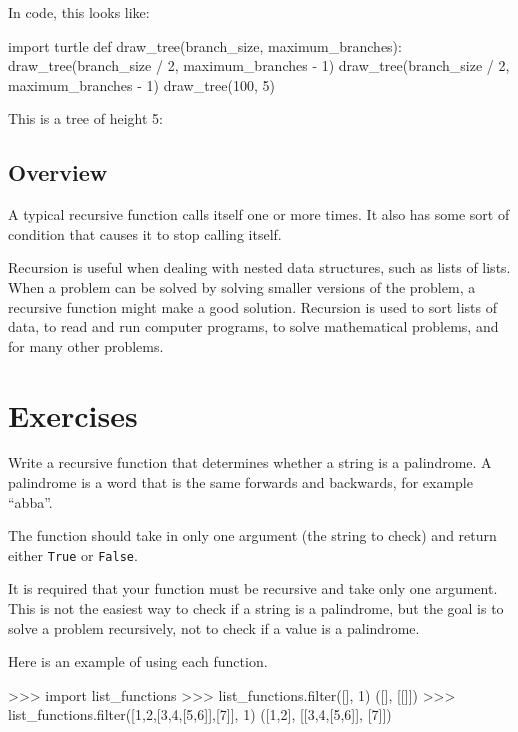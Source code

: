 \documentclass[11pt]{cselabheader}
\begin{document}
In code, this looks like:
\begin{python3code}
import turtle
def draw_tree(branch_size, maximum_branches):
    draw_tree(branch_size / 2, maximum_branches - 1)
    draw_tree(branch_size / 2, maximum_branches - 1)
draw_tree(100, 5)
\end{python3code}

This is a tree of height 5:
\begin{center}
\end{center}

\subsection{Overview}
A typical recursive function calls itself one or more times.
It also has some sort of condition that causes it to stop calling itself.

Recursion is useful when dealing with nested data structures, such as
lists of lists. When a problem can be solved by solving smaller
versions of the problem, a recursive function might make a good
solution.  Recursion is used to sort lists of data, to read and run
computer programs, to solve mathematical problems, and for many other
problems.

\newpage
\section{Exercises}

\begin{ex}[palindrome.py] Write a recursive function that determines whether a
    string is a palindrome. A palindrome is a word that is the same forwards and
    backwards, for example ``abba''.

    The function should take in only one argument (the string to check) and
    return either \lstinline{True} or \lstinline{False}.

    It is required that your function must be recursive and take only one argument.
    This is not the easiest way to check if a string is a palindrome, but the goal
    is to solve a problem recursively, not to check if a value is a palindrome.
\end{ex}

\begin{ex}



Here is an example of using each function.
\begin{pyconcode}
>>> import list_functions
>>> list_functions.filter([], 1)
([], [[]])
>>> list_functions.filter([1,2,[3,4,[5,6]],[7]], 1)
([1,2], [[3,4,[5,6]], [7]])
\end{pyconcode}
\end{ex}
\end{document}
